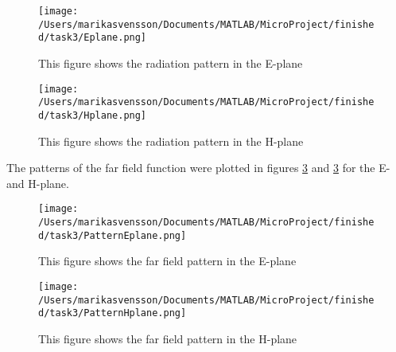 \begin{figure}[h]
\centering
\texttt{[image: /Users/marikasvensson/Documents/MATLAB/MicroProject/finished/task3/Eplane.png]}
\caption{This figure shows the radiation pattern in the E-plane}
\label{task3:E-plane}
\end{figure}


\begin{figure}[h]
\centering
\texttt{[image: /Users/marikasvensson/Documents/MATLAB/MicroProject/finished/task3/Hplane.png]}
\caption{This figure shows the radiation pattern in the H-plane}
\label{task3:H-plane}
\end{figure}

The patterns of the far field function were plotted in figures \ref{task3:PatternE-plane} and \ref{task3:PatternE-plane} for the E- and H-plane. 

\begin{figure}[h]
\centering
\texttt{[image: /Users/marikasvensson/Documents/MATLAB/MicroProject/finished/task3/PatternEplane.png]}
\caption{This figure shows the far field pattern in the E-plane}
\label{task3:PatternE-plane}
\end{figure}


\begin{figure}[h]
\centering
\texttt{[image: /Users/marikasvensson/Documents/MATLAB/MicroProject/finished/task3/PatternHplane.png]}
\caption{This figure shows the far field pattern in the H-plane}
\label{task3:PatternH-plane}
\end{figure}



